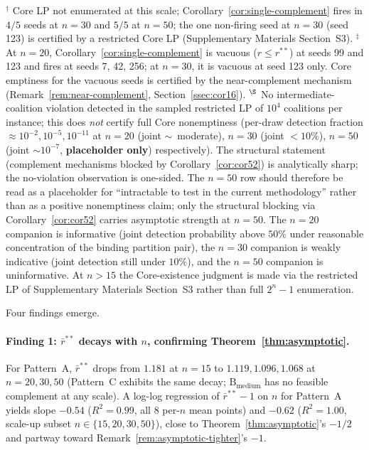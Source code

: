 \documentclass[11pt]{article}
\theoremstyle{plain}
\theoremstyle{definition}
\theoremstyle{remark}
\begin{document}
\begin{table}[t]
{\footnotesize $^{\dagger}$ Core LP not enumerated at this scale; Corollary~\ref{cor:single-complement} fires in $4/5$ seeds at $n=30$ and $5/5$ at $n=50$; the one non-firing seed at $n=30$ (seed 123) is certified by a restricted Core LP (Supplementary Materials Section~S3). $^{\ddagger}$ At $n=20$, Corollary~\ref{cor:single-complement} is vacuous ($r\le r^{\ast\ast}$) at seeds 99 and 123 and fires at seeds 7, 42, 256; at $n=30$, it is vacuous at seed 123 only. Core emptiness for the vacuous seeds is certified by the near-complement mechanism (Remark~\ref{rem:near-complement}, Section~\ref{ssec:cor16}). $^{\S}$ No intermediate-coalition violation detected in the sampled restricted LP of $10^{4}$ coalitions per instance; this does \emph{not} certify full Core nonemptiness (per-draw detection fraction $\approx 10^{-2}, 10^{-5}, 10^{-11}$ at $n=20$ (joint $\sim$~moderate), $n=30$ (joint $<10\%$), $n=50$ (joint $\sim 10^{-7}$, \textbf{placeholder only}) respectively). The structural statement (complement mechanisms blocked by Corollary~\ref{cor:cor52}) is analytically sharp; the no-violation observation is one-sided. The $n=50$ row should therefore be read as a placeholder for ``intractable to test in the current methodology'' rather than as a positive nonemptiness claim; only the structural blocking via Corollary~\ref{cor:cor52} carries asymptotic strength at $n=50$. The $n=20$ companion is informative (joint detection probability above $50\%$ under reasonable concentration of the binding partition pair), the $n=30$ companion is weakly indicative (joint detection still under $10\%$), and the $n=50$ companion is uninformative. At $n>15$ the Core-existence judgment is made via the restricted LP of Supplementary Materials Section~S3 rather than full $2^n-1$ enumeration.}
\end{table}

Four findings emerge.

\paragraph{Finding 1: $\bar r^{\ast\ast}$ decays with $n$, confirming Theorem~\ref{thm:asymptotic}.} For Pattern~A, $\bar r^{\ast\ast}$ drops from $1.181$ at $n=15$ to $1.119, 1.096, 1.068$ at $n=20, 30, 50$ (Pattern~C exhibits the same decay; $\text{B}_{\text{medium}}$ has no feasible complement at any scale). A log-log regression of $\bar r^{\ast\ast}-1$ on $n$ for Pattern~A yields slope $-0.54$ ($R^2=0.99$, all 8 per-$n$ mean points) and $-0.62$ ($R^2=1.00$, scale-up subset $n\in\{15,20,30,50\}$), close to Theorem~\ref{thm:asymptotic}'s $-1/2$ and partway toward Remark~\ref{rem:asymptotic-tighter}'s $-1$.
\end{document}
